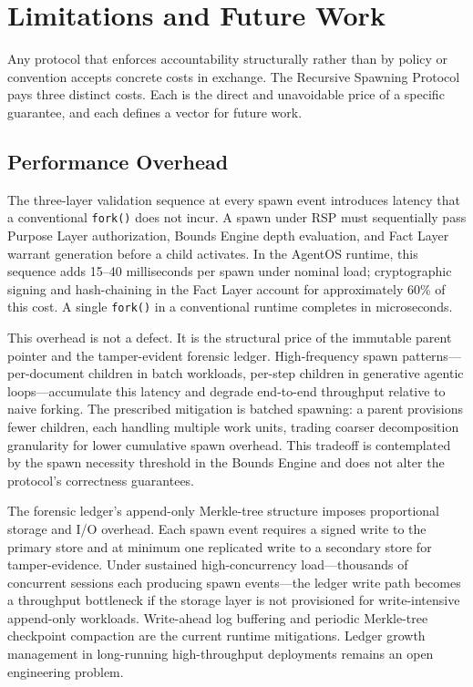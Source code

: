 \section{Limitations and Future Work}
\label{sec:rs-limitations}

Any protocol that enforces accountability structurally rather than by policy or convention accepts concrete costs in exchange. The Recursive Spawning Protocol pays three distinct costs. Each is the direct and unavoidable price of a specific guarantee, and each defines a vector for future work.

\subsection{Performance Overhead}
\label{sec:rs-perf-overhead}

The three-layer validation sequence at every spawn event introduces latency that a conventional \texttt{fork()} does not incur. A spawn under RSP must sequentially pass Purpose Layer authorization, Bounds Engine depth evaluation, and Fact Layer warrant generation before a child activates. In the AgentOS runtime, this sequence adds \numrange{15}{40} milliseconds per spawn under nominal load; cryptographic signing and hash-chaining in the Fact Layer account for approximately 60\% of this cost. A single \texttt{fork()} in a conventional runtime completes in microseconds.

This overhead is not a defect. It is the structural price of the immutable parent pointer and the tamper-evident forensic ledger. High-frequency spawn patterns---per-document children in batch workloads, per-step children in generative agentic loops---accumulate this latency and degrade end-to-end throughput relative to naive forking. The prescribed mitigation is batched spawning: a parent provisions fewer children, each handling multiple work units, trading coarser decomposition granularity for lower cumulative spawn overhead. This tradeoff is contemplated by the spawn necessity threshold in the Bounds Engine and does not alter the protocol's correctness guarantees.

The forensic ledger's append-only Merkle-tree structure imposes proportional storage and I/O overhead. Each spawn event requires a signed write to the primary store and at minimum one replicated write to a secondary store for tamper-evidence. Under sustained high-concurrency load---thousands of concurrent sessions each producing spawn events---the ledger write path becomes a throughput bottleneck if the storage layer is not provisioned for write-intensive append-only workloads. Write-ahead log buffering and periodic Merkle-tree checkpoint compaction are the current runtime mitigations. Ledger growth management in long-running high-throughput deployments remains an open engineering problem.

